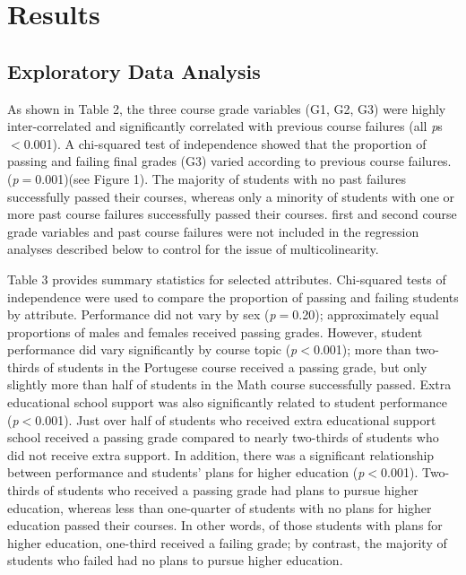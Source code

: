 \documentclass[sigconf]{acmart}
\begin{document}
 
\section{Results}

\subsection{Exploratory Data Analysis}

As shown in Table 2, the three course grade variables (G1, G2, G3) were highly 
inter-correlated and significantly correlated with previous course failures 
(all \textit{p}s$<$0.001).  A chi-squared test of independence showed that 
the proportion of passing and failing final grades (G3) varied according to 
previous course failures. (\textit{p}$=$0.001)(see Figure 1). The majority of 
students with no past failures successfully passed their courses, whereas 
only a minority of students with one or more past course failures successfully
passed their courses. first and second course grade variables and past course
failures were not included in the regression analyses described below to 
control for the issue of multicolinearity.

Table 3 provides summary statistics for selected attributes. Chi-squared tests 
of independence were used to compare the proportion of passing and failing 
students by attribute. Performance did not vary by sex (\textit{p}$=$0.20); 
approximately equal proportions of males and females received passing grades. 
However, student performance did vary significantly by course topic 
(\textit{p}$<$0.001); more than two-thirds of students in the Portugese course 
received a passing grade, but only slightly more than half of students in the 
Math course successfully passed. Extra educational school support was also 
significantly related to student performance (\textit{p}$<$0.001). Just over 
half of students who received extra educational support school received a 
passing grade compared to nearly two-thirds of students who did not receive 
extra support. In addition, there was a significant relationship between 
performance and students' plans for higher education (\textit{p}$<$0.001). 
Two-thirds of students who received a passing grade had plans to pursue higher 
education, whereas less than one-quarter of students with no plans for 
higher education passed their courses. In other words, of those students with 
plans for higher education, one-third received a failing grade; by contrast,
the majority of students who failed had no plans to pursue higher education. 
\end{document}

